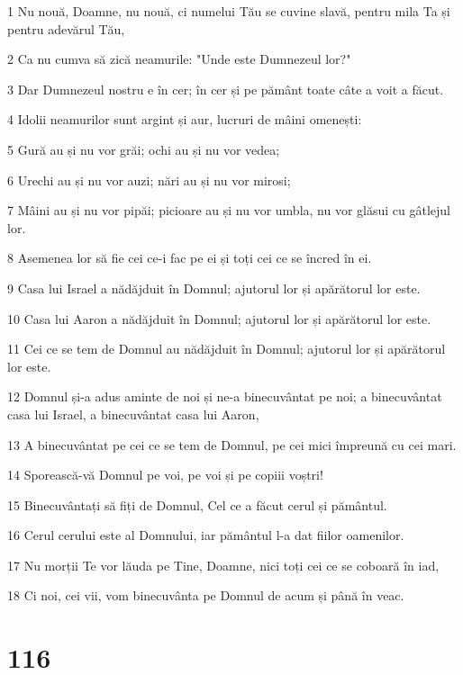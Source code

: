 \par 1 Nu nouă, Doamne, nu nouă, ci numelui Tău se cuvine slavă, pentru mila Ta și pentru adevărul Tău,
\par 2 Ca nu cumva să zică neamurile: "Unde este Dumnezeul lor?"
\par 3 Dar Dumnezeul nostru e în cer; în cer și pe pământ toate câte a voit a făcut.
\par 4 Idolii neamurilor sunt argint și aur, lucruri de mâini omenești:
\par 5 Gură au și nu vor grăi; ochi au și nu vor vedea;
\par 6 Urechi au și nu vor auzi; nări au și nu vor mirosi;
\par 7 Mâini au și nu vor pipăi; picioare au și nu vor umbla, nu vor glăsui cu gâtlejul lor.
\par 8 Asemenea lor să fie cei ce-i fac pe ei și toți cei ce se încred în ei.
\par 9 Casa lui Israel a nădăjduit în Domnul; ajutorul lor și apărătorul lor este.
\par 10 Casa lui Aaron a nădăjduit în Domnul; ajutorul lor și apărătorul lor este.
\par 11 Cei ce se tem de Domnul au nădăjduit în Domnul; ajutorul lor și apărătorul lor este.
\par 12 Domnul și-a adus aminte de noi și ne-a binecuvântat pe noi; a binecuvântat casa lui Israel, a binecuvântat casa lui Aaron,
\par 13 A binecuvântat pe cei ce se tem de Domnul, pe cei mici împreună cu cei mari.
\par 14 Sporească-vă Domnul pe voi, pe voi și pe copiii voștri!
\par 15 Binecuvântați să fiți de Domnul, Cel ce a făcut cerul și pământul.
\par 16 Cerul cerului este al Domnului, iar pământul l-a dat fiilor oamenilor.
\par 17 Nu morții Te vor lăuda pe Tine, Doamne, nici toți cei ce se coboară în iad,
\par 18 Ci noi, cei vii, vom binecuvânta pe Domnul de acum și până în veac.

\chapter{116}

